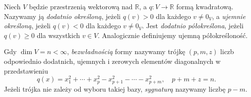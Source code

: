 \begin{definicja}
\label{def:lin9-dodatniosc-sygnatura}
Niech \(V\) będzie przestrzenią
wektorową nad \(\mathbb R\),
a \(q\colon V\to\mathbb R\)
formą kwadratową.
Nazywamy ją \emph{dodatnio określoną},
jeżeli \(q(v)>0\)
dla każdego \(v\ne0_V\),
a \emph{ujemnie określoną},
jeżeli \(q(v)<0\) dla
każdego \(v\ne0_V\).
Jest \emph{dodatnio półokreślona},
jeżeli \(q(v)\ge0\)
dla wszystkich \(v\in V\).
Analogicznie definiujemy
ujemną półokreśloność.

Gdy \(\dim V=n<\infty\),
\emph{bezwładnością} formy
nazywamy trójkę \((p,m,z)\)
liczb odpowiednio dodatnich,
ujemnych i zerowych elementów
diagonalnych w przedstawieniu
\[
 q(x)=x_1^2+\cdots+x_p^2
       -x_{p+1}^2-\cdots-x_{p+m}^2,
 \quad p+m+z=n.
\]
Jeżeli trójka nie zależy
od wyboru takiej bazy,
\emph{sygnaturą} nazywamy
liczbę \(p-m\).
\end{definicja}

